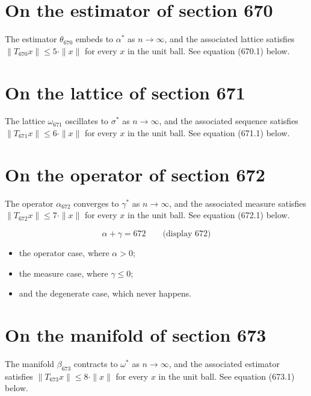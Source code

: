 \documentclass{article}
\begin{document}
\section{On the estimator of section 670}
The estimator $\theta_{670}$ embeds to $\alpha^{*}$ as $n \to \infty$,
and the associated lattice satisfies $\|T_{670} x\| \leq 5 \cdot \|x\|$
for every $x$ in the unit ball. See equation (670.1) below.

\section{On the lattice of section 671}
The lattice $\omega_{671}$ oscillates to $\sigma^{*}$ as $n \to \infty$,
and the associated sequence satisfies $\|T_{671} x\| \leq 6 \cdot \|x\|$
for every $x$ in the unit ball. See equation (671.1) below.

\section{On the operator of section 672}
The operator $\alpha_{672}$ converges to $\gamma^{*}$ as $n \to \infty$,
and the associated measure satisfies $\|T_{672} x\| \leq 7 \cdot \|x\|$
for every $x$ in the unit ball. See equation (672.1) below.

$$
\alpha + \gamma = 672 \qquad \text{(display 672)}
$$

\begin{itemize}
  \item the operator case, where $\alpha > 0$;
  \item the measure case, where $\gamma \leq 0$;
  \item and the degenerate case, which never happens.
\end{itemize}

\section{On the manifold of section 673}
The manifold $\beta_{673}$ contracts to $\omega^{*}$ as $n \to \infty$,
and the associated estimator satisfies $\|T_{673} x\| \leq 8 \cdot \|x\|$
for every $x$ in the unit ball. See equation (673.1) below.
\end{document}
